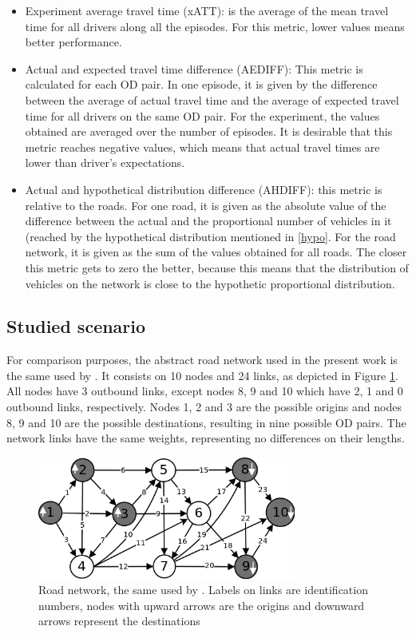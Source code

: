 \documentclass[12pt]{article}
\begin{document}
\begin{itemize}
	\item Experiment average travel time (xATT): is the average of the mean travel time for all drivers along all the episodes. For this metric, lower values means better performance.
	\item Actual and expected travel time difference (AEDIFF): This metric is calculated for each OD pair. In one episode, it is given by the difference between the average of actual travel time and the average of expected travel time for all drivers on the same OD pair. For the experiment, the values obtained are averaged over the number of episodes. It is desirable that this metric reaches negative values, which means that actual travel times are lower than driver's expectations.
	\item Actual and hypothetical distribution difference (AHDIFF): this metric is relative to the roads. For one road, it is given as the absolute value of the difference between the actual and the proportional number of vehicles in it (reached by the hypothetical distribution mentioned in \ref{hypo}. For the road network, it is given as the sum of the values obtained for all roads. The closer this metric gets to zero the better, because this means that the distribution of vehicles on the network is close to the hypothetic proportional distribution.
\end{itemize}

\subsection{Studied scenario}

For comparison purposes, the abstract road network used in the present work is the same used by \cite{Galib&Moser2011}. It consists on 10 nodes and 24 links, as depicted in Figure \ref{fig:roadnetwork}. All nodes have 3 outbound links, except nodes 8, 9 and 10 which have 2, 1 and 0 outbound links, respectively. Nodes 1, 2 and 3 are the possible origins and nodes 8, 9 and 10 are the possible destinations, resulting in nine possible OD pairs. The network links have the same weights, representing no differences on their lengths.

\begin{figure}[ht]
    \centerline{\includegraphics[width=8.5cm]{img/roadnetwork.png}}
    \caption{Road network, the same used by \cite{Galib&Moser2011}. Labels on links are identification numbers, nodes with upward arrows are the origins and downward arrows represent the destinations}
    \label{fig:roadnetwork}
\end{figure}
\end{document}
